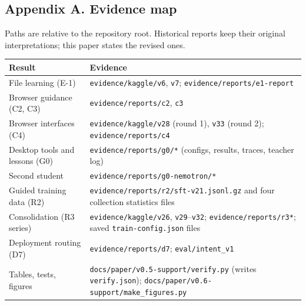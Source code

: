 \documentclass[
  10pt,
]{article}
\newcounter{none} %
\begin{document}
\normalsize

\subsection{Appendix A. Evidence map}\label{appendix-a.-evidence-map}

Paths are relative to the repository root. Historical reports keep their
original interpretations; this paper states the revised ones.

{\def\LTcaptype{none} %
\begin{longtable}[]{@{}
  >{\raggedright\arraybackslash}p{}
  >{\raggedright\arraybackslash}p{}@{}}
\toprule\noalign{}
\begin{minipage}[b]{\linewidth}\raggedright
Result
\end{minipage} & \begin{minipage}[b]{\linewidth}\raggedright
Evidence
\end{minipage} \\
\midrule\noalign{}
\endhead
\bottomrule\noalign{}
\endlastfoot
File learning (E-1) & \texttt{evidence/kaggle/v6}, \texttt{v7};
\texttt{evidence/reports/e1-report} \\
Browser guidance (C2, C3) & \texttt{evidence/reports/c2}, \texttt{c3} \\
Browser interfaces (C4) & \texttt{evidence/kaggle/v28} (round 1),
\texttt{v33} (round 2); \texttt{evidence/reports/c4} \\
Desktop tools and lessons (G0) & \texttt{evidence/reports/g0/*}
(configs, results, traces, teacher log) \\
Second student & \texttt{evidence/reports/g0-nemotron/*} \\
Guided training data (R2) &
\texttt{evidence/reports/r2/sft-v21.jsonl.gz} and four collection
statistics files \\
Consolidation (R3 series) & \texttt{evidence/kaggle/v26},
\texttt{v29}--\texttt{v32}; \texttt{evidence/reports/r3*}; saved
\texttt{train-config.json} files \\
Deployment routing (D7) & \texttt{evidence/reports/d7};
\texttt{eval/intent\_v1} \\
Tables, tests, figures & \texttt{docs/paper/v0.5-support/verify.py}
(writes \texttt{verify.json});
\texttt{docs/paper/v0.6-support/make\_figures.py} \\
\end{longtable}
}
\end{document}
